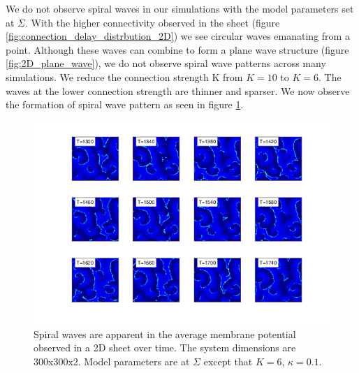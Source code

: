 \documentclass[12pt]{article}
\begin{document}
We do not observe spiral waves in our simulations with the model parameters set at $\Sigma$.
With the higher connectivity observed in the sheet (figure \ref{fig:connection_delay_distrbution_2D}) we see circular waves emanating from a point.
Although these waves can combine to form a plane wave structure (figure \ref{fig:2D_plane_wave}), we do not observe spiral wave patterns across many simulations.
We reduce the connection strength K from $K=10$ to $K=6$.
The waves at the lower connection strength are thinner and sparser.
We now observe the formation of spiral wave pattern as seen in figure \ref{fig:2DSpiralWaves}.
\begin{figure}[!htb]
 \caption{ Spiral waves are apparent in the average membrane potential observed in a 2D sheet over time. 
           The system dimensions are 300x300x2. Model parameters are at $\Sigma$ except that $K=6$, $\kappa=0.1$.
           }
 \label{fig:2DSpiralWaves}
 \centering
   \includegraphics[width=\textwidth]{fig/SpiralWaves2D_K6_kappa0p1_M4}
\end{figure}
\FloatBarrier
\end{document}
